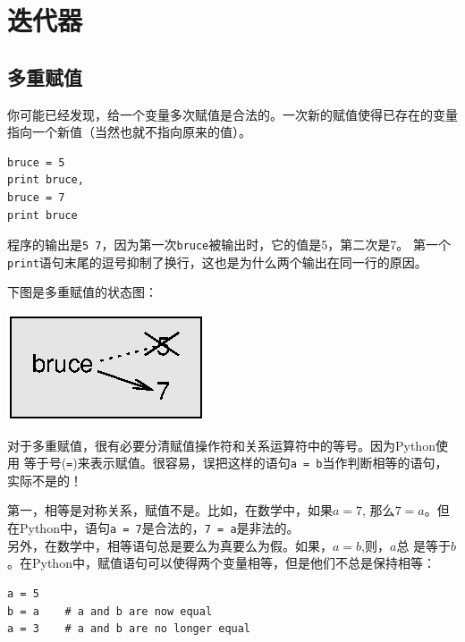 \chapter{迭代器}

\section{多重赋值}

你可能已经发现，给一个变量多次赋值是合法的。一次新的赋值使得已存在的变量指向一个新值（当然也就不指向原来的值）。

\beforeverb
\begin{verbatim}
bruce = 5
print bruce,
bruce = 7
print bruce
\end{verbatim}
\afterverb

程序的输出是{\tt 5 7}，因为第一次{\tt bruce}被输出时，它的值是5，第二次是7。
第一个{\tt print}语句末尾的逗号抑制了换行，这也是为什么两个输出在同一行的原因。


下图是多重赋值的状态图：


\beforefig
\centerline{\includegraphics{figs/assign2.eps}}
\afterfig

对于多重赋值，很有必要分清赋值操作符和关系运算符中的等号。因为Python使用
等于号({\tt =})来表示赋值。很容易，误把这样的语句{\tt a = b}当作判断相等的语句，
实际不是的！\\



第一，相等是对称关系，赋值不是。比如，在数学中，如果$a = 7$, 那么$7 =
a$。但在Python中，语句{\tt a = 7}是合法的，{\tt 7 = a}是非法的。\\

另外，在数学中，相等语句总是要么为真要么为假。如果，$a = b$,则，$a$总
是等于$b$。在Python中，赋值语句可以使得两个变量相等，但是他们不总是保持相等：

\beforeverb
\begin{verbatim}
a = 5
b = a    # a and b are now equal
a = 3    # a and b are no longer equal
\end{verbatim}
\afterverb
%

